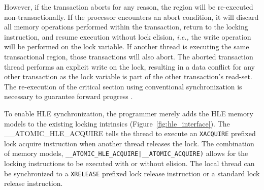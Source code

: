 \documentclass{sig-alternate}
\begin{document}
However, if the transaction aborts for any reason, the region will be re-executed
non-transactionally.  If the processor encounters an abort condition, it will discard all
memory operations performed within the transaction, return to the locking instruction, and
resume execution without lock elision, \emph{i.e.,} the write operation will be performed
on the lock variable.  If another thread is executing the same transactional region, those
transactions will also abort.  The aborted transaction thread performs an explicit write
on the lock, resulting in a data conflict for any other transaction as the lock variable
is part of the other transaction's read-set.  The re-execution of the critical section
using conventional synchronization is necessary to guarantee forward progress
\cite{intel_prog_ref}.


To enable HLE synchronization, the programmer merely adds the HLE memory models to the
existing locking intrinsics (Figure~\ref{fig:hle_interface}).  The
\_\_ATOMIC\_HLE\_ACQUIRE tells the thread to execute an \texttt{XACQUIRE} prefixed lock
acquire instruction when another thread releases the lock.  The combination of memory
models, \texttt{\_\_ATOMIC\_HLE\_ACQUIRE|\_\_ATOMIC\_ACQUIRE)} allows for the locking
instructions to be executed with or without elision.  The local thread can be synchronized
to a \texttt{XRELEASE} prefixed lock release instruction or a standard lock release
instruction.
\end{document}
